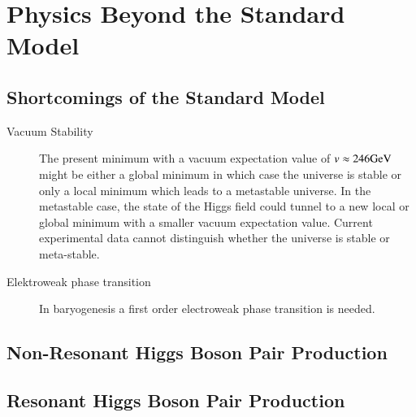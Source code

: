 \section{Physics Beyond the Standard Model}

\subsection{Shortcomings of the Standard Model}



\begin{description}

\item[Vacuum Stability] The present minimum with a vacuum expectation
  value of $v \approx \si{246}{\ensuremath{\text{GeV}}}$ might be either a global minimum
  in which case the universe is stable or only a local minimum which
  leads to a metastable universe. In the metastable case, the state of
  the Higgs field could tunnel to a new local or global minimum with a
  smaller vacuum expectation value. Current experimental data cannot
  distinguish whether the universe is stable or
  meta-stable.

\item[Elektroweak phase transition] In baryogenesis a first order
  electroweak phase transition is needed.

\end{description}



\subsection{Non-Resonant Higgs Boson Pair Production}



\subsection{Resonant Higgs Boson Pair Production}






